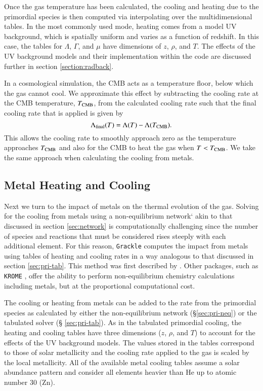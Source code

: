 Once the gas temperature has been calculated, the cooling and heating
due to the primordial species is then computed via interpolating over
the multidimensional tables.  In the most commonly used mode, heating
comes from a model UV background, which is spatially uniform and
varies as a function of redshift.  In this case, the tables for
$\Lambda$, $\Gamma$, and $\mu$ have dimensions of $z$, $\rho$, and
$T$.  The effects of the UV background models and their implementation
within the code are discussed further in section
\ref{section:radback}.

In a cosmological simulation, the CMB acts as a temperature floor,
below which the gas cannot cool.  We approximate this effect by
subtracting the cooling rate at the CMB temperature, $T_{\rm CMB}$, from
the calculated cooling rate such that the final cooling rate that is
applied is given by
\begin{equation}
\Lambda_{\rm final}(T) = \Lambda(T) - \Lambda(T_{\rm CMB}).
\end{equation}
This allows the cooling rate to smoothly approach zero as the
temperature approaches $T_{\rm CMB}$ and also for the CMB to heat the gas
when $T < T_{\rm CMB}$.  We take the same approach when calculating the
cooling from metals.


\subsection{Metal Heating and Cooling}

Next we turn to the impact of metals on the thermal evolution of the gas.
Solving for the cooling from metals using a non-equilibrium network`
akin to that discussed in section \ref{sec:network} is computationally
challenging since the number of species and reactions that must be
considered rises steeply with each additional element.  For this
reason, \texttt{Grackle} computes the impact from metals using tables of
heating and cooling rates in a way analogous to that discussed in section
\ref{sec:pri-tab}.  This method was first described by
\citet{2008MNRAS.385.1443S}.  Other packages, such as \texttt{KROME}
\citep{2014MNRAS.439.2386G}, offer the ability to perform
non-equilibrium chemistry calculations including metals, but at the
proportional computational cost.

The cooling or heating from metals can be added to the rate from the
primordial species as calculated by either the non-equilibrium network
(\S \ref{sec:pri-neq}) or the tabulated solver (\S
\ref{sec:pri-tab}).  As in the tabulated primordial cooling, the
heating and cooling tables have three dimensions ($z$, $\rho$, and
$T$) to account for the effects of the UV background models.  The
values stored in the tables correspond to those of solar metallicity
and the cooling rate applied to the gas is scaled by the local
metallicity.  All of the available metal cooling tables assume a solar
abundance pattern and consider all elements heavier than He up to
atomic number 30 (Zn).

